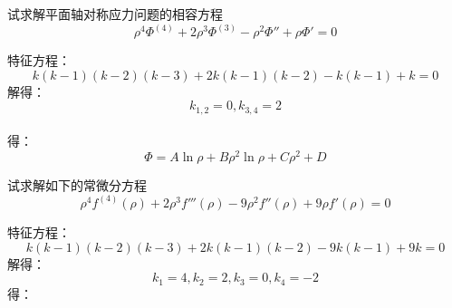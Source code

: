 \begin{example}
试求解平面轴对称应力问题的相容方程\[\rho ^4\varPhi ^{\left( 4 \right)}+2\rho ^3\varPhi ^{\left( 3 \right)}-\rho ^2\varPhi ''+\rho \varPhi '=0\]
\end{example}
	\begin{remark}
	特征方程：
	\[k\left( k-1 \right) \left( k-2 \right) \left( k-3 \right) +2k\left( k-1 \right) \left( k-2 \right) -k\left( k-1 \right) +k=0\]
	解得：$$k_{1,2}=0,k_{3,4}=2$$\\
	得：$$\varPhi =A\ln \rho +B\rho ^2\ln \rho +C\rho ^2+D$$
	\end{remark}

\begin{example}
试求解如下的常微分方程
\[\rho ^4f^{\left( 4 \right)}\left( \rho \right) +2\rho ^3f'''\left( \rho \right) -9\rho ^2f''\left( \rho \right) +9\rho f'\left( \rho \right) =0\]
\end{example}
	\begin{remark}
		特征方程：
		\[k\left( k-1 \right) \left( k-2 \right) \left( k-3 \right) +2k\left( k-1 \right) \left( k-2 \right) -9k\left( k-1 \right) +9k=0\]
		解得：\[k_1=4,k_2=2,k_3=0,k_4=-2\]
		得：\[\]
	\end{remark}
